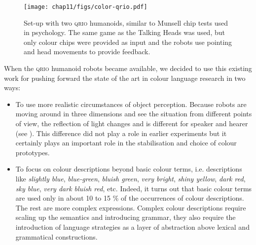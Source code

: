 \begin{figure}[htbp]
  \centerline{\texttt{[image: chap11/figs/color-qrio.pdf]}}
\caption{\label{fig:munsell}Set-up with two \textsc{qrio} humanoids, similar to Munsell chip tests used in psychology. The same game as the Talking 
Heads was used, but only colour chips were provided as input and the robots use pointing and head movements to 
provide feedback.}
\end{figure}

When the \textsc{qrio} humanoid robots became available, we decided to use this existing work for pushing forward the state of 
the art in colour language research in two ways:
\begin{itemize}
\item To use more realistic circumstances of object perception. Because 
robots are moving around in three dimensions and see the situation from different points of view, the reflection 
of light changes and is different for speaker and hearer (see ). This difference did not 
play a role in earlier experiments but 
it certainly plays an important role in the stabilisation and choice of colour prototypes. 
\item To focus on colour descriptions beyond basic colour terms, i.e. descriptions like 
\textit{slightly blue}, \textit{blue-green}, \textit{bluish green}, \textit{very bright}, \textit{shiny yellow}, \textit{dark red}, \textit{sky blue}, 
\textit{very dark bluish red}, etc. Indeed, it turns out that 
basic colour terms are used only in about 10 to 15 \% of the occurrences of colour descriptions. The rest are 
more complex expressions. Complex colour descriptions require scaling up the semantics and introducing grammar, they 
also require the introduction of language strategies as a layer of abstraction 
above lexical and grammatical constructions. 
\end{itemize}


